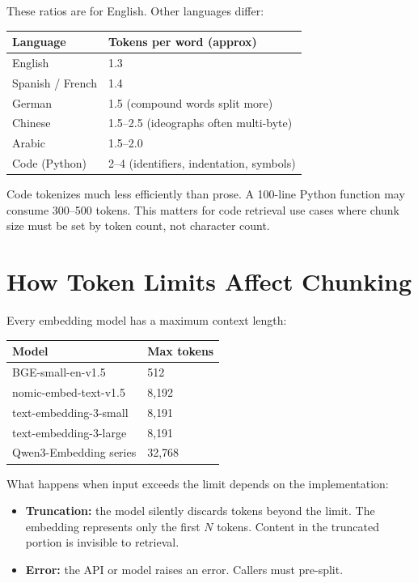 These ratios are for English. Other languages differ:

\begin{center}
\begin{tabular}{ll}
\toprule
\textbf{Language} & \textbf{Tokens per word (approx)} \\
\midrule
English & 1.3 \\
Spanish / French & 1.4 \\
German & 1.5 (compound words split more) \\
Chinese & 1.5--2.5 (ideographs often multi-byte) \\
Arabic & 1.5--2.0 \\
Code (Python) & 2--4 (identifiers, indentation, symbols) \\
\bottomrule
\end{tabular}
\end{center}

Code tokenizes much less efficiently than prose. A 100-line Python function may consume
300--500 tokens. This matters for code retrieval use cases where chunk size must be set by
token count, not character count.

\section{How Token Limits Affect Chunking}

Every embedding model has a maximum context length:

\begin{center}
\begin{tabular}{ll}
\toprule
\textbf{Model} & \textbf{Max tokens} \\
\midrule
BGE-small-en-v1.5 & 512 \\
nomic-embed-text-v1.5 & 8{,}192 \\
text-embedding-3-small & 8{,}191 \\
text-embedding-3-large & 8{,}191 \\
Qwen3-Embedding series & 32{,}768 \\
\bottomrule
\end{tabular}
\end{center}

What happens when input exceeds the limit depends on the implementation:

\begin{itemize}
    \item \textbf{Truncation:} the model silently discards tokens beyond the limit. The embedding
          represents only the first $N$ tokens. Content in the truncated portion is invisible
          to retrieval.
    \item \textbf{Error:} the API or model raises an error. Callers must pre-split.
\end{itemize}

